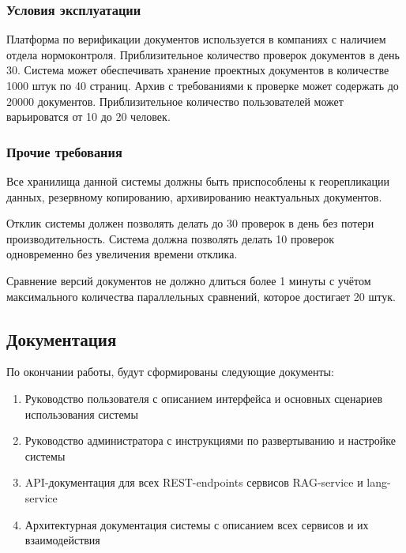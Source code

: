 \subsubsection{Условия эксплуатации}
Платформа по верификации документов используется в компаниях с наличием отдела нормоконтроля. Приблизительное количество проверок документов в день 30. 
Система может обеспечивать хранение проектных документов в количестве 1000 штук по 40 страниц. Архив с требованиями к проверке может содержать до 20000 документов.
Приблизительное количество пользователей может варьироватся от 10 до 20 человек.

\subsubsection{Прочие требования}
Все хранилища данной системы должны быть приспособлены к георепликации данных, резервному копированию, архивированию неактуальных документов.

Отклик системы должен позволять делать до 30 проверок в день без потери производительность. 
Система должна позволять делать 10 проверок одновременно без увеличения времени отклика.

Сравнение версий документов не должно длиться более 1 минуты с учётом максимального количества параллельных сравнений, которое достигает 20 штук.

\subsection{Документация}
По окончании работы, будут сформированы следующие документы:
\begin{enumerate}[label=\arabic*., nosep, leftmargin=*, labelindent=\parindent]
  \item Руководство пользователя с описанием интерфейса и основных сценариев использования системы
  \item Руководство администратора с инструкциями по развертыванию и настройке системы
  \item API-документация для всех REST-endpoints сервисов RAG-service и lang-service
  \item Архитектурная документация системы с описанием всех сервисов и их взаимодействия
\end{enumerate}

